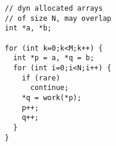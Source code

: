\begin{lstlisting}[morekeywords={g_qCount},belowskip=0pt]
// dyn allocated arrays
// of size N, may overlap
int *a, *b;

for (int k=0;k<M;k++) {
  int *p = a, *q = b;
  for (int i=0;i<N;i++) {
    if (rare)
      continue;
    *q = work(*p);
    p++;
    q++;
  }
}
\end{lstlisting}
